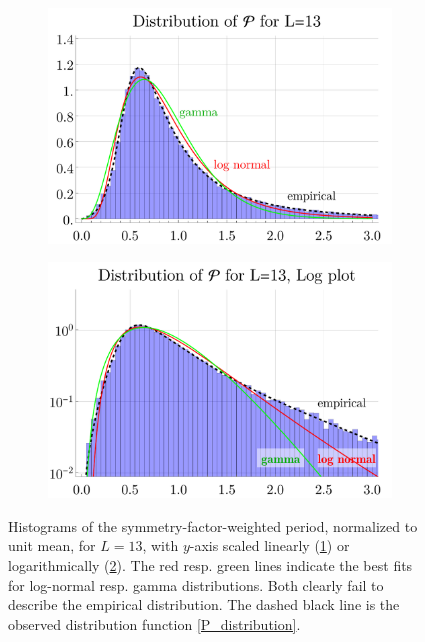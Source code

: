 \documentclass[12pt,a4paper]{article}
\renewcommand{\|}{\rule[-0.4ex]{0.2ex}{1.2em}}
\begin{document}
\begin{figure}[htbp]
	\begin{subfigure}[b]{.48 \textwidth}
		\includegraphics[width=\linewidth]{distribution_comparison}
		\subcaption{}
		\label{histograms_comparisonA}
	\end{subfigure}
	\begin{subfigure}[b]{.48 \textwidth}
		\includegraphics[width=\linewidth]{distribution_comparison_log}
		\subcaption{}
		\label{histograms_comparisonB}
	\end{subfigure}
	
	\caption{Histograms of the symmetry-factor-weighted period, normalized to unit mean, for $L=13$, with $y$-axis scaled linearly (\ref{histograms_comparisonA}) or logarithmically (\ref{histograms_comparisonB}). The red resp. green lines indicate the best fits for log-normal resp. gamma distributions. Both clearly fail to describe the empirical distribution. The dashed black line is the observed distribution function \cref{P_distribution}. }
	\label{fig:histograms_comparison}
\end{figure}
\end{document}
